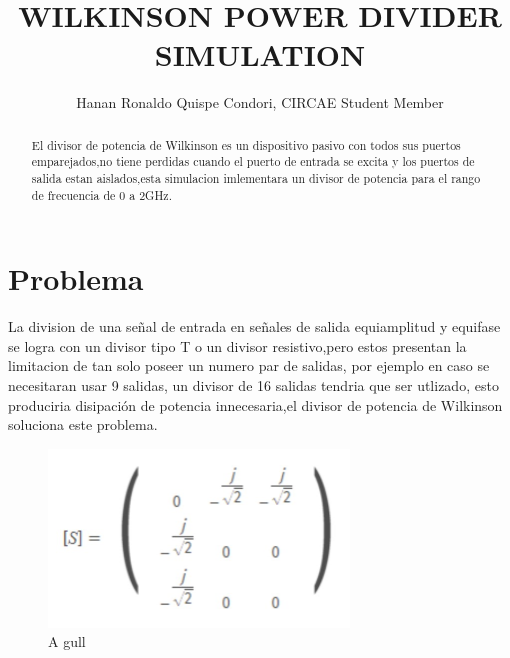 \documentclass[a4paper]{IEEEtran} %
\begin{document}
\title{WILKINSON POWER DIVIDER SIMULATION}
\author{Hanan Ronaldo Quispe Condori, CIRCAE Student Member}
\maketitle
\begin{abstract}
El divisor de potencia de Wilkinson es un dispositivo pasivo con todos sus puertos emparejados,no tiene perdidas cuando el puerto de entrada se excita y los puertos de salida estan aislados,esta simulacion imlementara un divisor de potencia para el rango de frecuencia de 0 a 2GHz.
\end{abstract}
\section{Problema}
La division de una señal de entrada en señales de salida equiamplitud y equifase se logra con un divisor tipo T o un divisor resistivo,pero estos presentan la limitacion de tan solo poseer un numero par de salidas, por ejemplo en caso se necesitaran usar 9 salidas, un divisor de 16 salidas tendria que ser utlizado, esto produciria disipación de potencia innecesaria,el divisor de potencia de Wilkinson soluciona este problema.
\begin{figure}
    \centering
        \includegraphics[width=8cm]{imagenes/img1}
        \caption{A gull}
        \label{fig E-field phase animation of a Wilkinson power divider.}
\end{figure}


\end{document}
